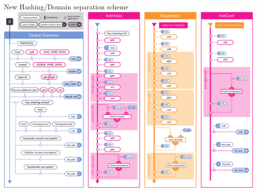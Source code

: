 \documentclass{rosenpass-beamer}
\begin{document}
\begin{frame}{New Hashing/Domain separation scheme}
  \includegraphics[height=.9\textheight]{graphics/rosenpass-wp-hashing-tree.pdf}
\end{frame}

\printbibliography
\end{document}
